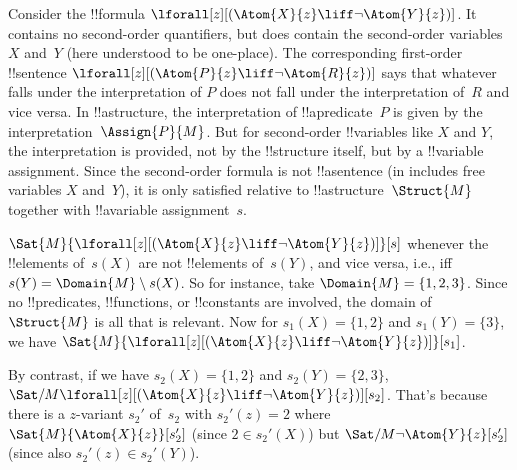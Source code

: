 \documentclass[../../../include/open-logic-section]{subfiles}
\begin{document}
\begin{ex}
  Consider the !!{formula} $\lforall[z][(\Atom{X}{z} \liff \lnot
    \Atom{Y}{z})]$. It contains no second-order quantifiers, but does
  contain the second-order variables $X$ and~$Y$ (here understood to
  be one-place). The corresponding first-order !!{sentence}
  $\lforall[z][(\Atom{P}{z} \liff \lnot \Atom{R}{z})]$ says that
  whatever falls under the interpretation of $P$ does not fall under
  the interpretation of~$R$ and vice versa. In !!a{structure}, the
  interpretation of !!a{predicate}~$P$ is given by the
  interpretation~$\Assign{P}{M}$. But for second-order !!{variable}s
  like $X$ and $Y$, the interpretation is provided, not by the
  !!{structure} itself, but by a !!{variable} assignment. Since the
  second-order formula is not !!a{sentence} (in includes free
  variables $X$ and~$Y$), it is only satisfied relative to
  !!a{structure}~$\Struct{M}$ together with !!a{variable}
  assignment~$s$.

  $\Sat{M}{\lforall[z][(\Atom{X}{z} \liff \lnot \Atom{Y}{z})]}[s]$
  whenever the !!{element}s of~$s(X)$ are not !!{element}s of~$s(Y)$,
  and vice versa, i.e., iff $s(Y) = \Domain{M} \setminus s(X)$. So for
  instance, take $\Domain{M} = \{1, 2, 3\}$. Since no !!{predicate}s,
  !!{function}s, or !!{constant}s are involved, the domain
  of~$\Struct{M}$ is all that is relevant. Now for $s_1(X) = \{1, 2\}$
  and $s_1(Y) = \{3\}$, we have $\Sat{M}{\lforall[z][(\Atom{X}{z}
      \liff \lnot \Atom{Y}{z})]}[s_1]$.

  By contrast, if we have $s_2(X) = \{1, 2\}$ and $s_2(Y) = \{2, 3\}$,
  $\Sat/{M}{\lforall[z][(\Atom{X}{z} \liff \lnot
      \Atom{Y}{z})]}[s_2]$. That's because there is a $z$-variant
  $s_2'$ of~$s_2$ with $s_2'(z) = 2$ where
  $\Sat{M}{\Atom{X}{z}}[s_2']$ (since $2 \in s_2'(X)$) but
  $\Sat/{M}{\lnot \Atom{Y}{z}}[s_2']$ (since also $s_2'(z) \in
  s_2'(Y)$).
\end{ex}
\end{document}
